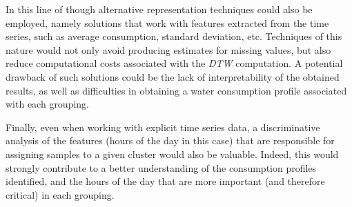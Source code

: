 \documentclass[9pt,journal,compsoc]{IEEEtran}
\begin{document}
In this line of though alternative representation techniques could also be employed, namely solutions that work with features extracted from the time series, such as average consumption, standard deviation, etc. Techniques of this nature would not only avoid producing estimates for missing values, but also reduce computational costs associated with the \emph{DTW} computation. A potential drawback of such solutions could be the lack of interpretability of the obtained results, as well as difficulties in obtaining a water consumption profile associated with each grouping.

Finally, even when working with explicit time series data, a discriminative analysis of the features (hours of the day in this case) that are responsible for assigning samples to a given cluster would also be valuable. Indeed, this would strongly contribute to a better understanding of the consumption profiles identified, and the hours of the day that are more important (and therefore critical) in each grouping.



\end{document}
